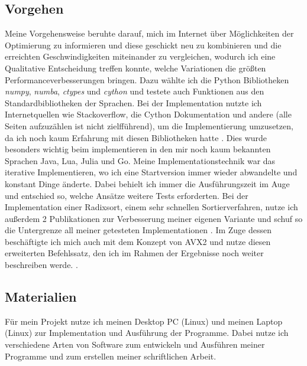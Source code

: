 \documentclass[12pt,a4paper]{article}
\begin{document}
\subsection{Vorgehen}
Meine Vorgehensweise beruhte darauf, mich im Internet über Möglichkeiten der Optimierung zu informieren und diese geschickt neu zu kombinieren und die erreichten Geschwindigkeiten miteinander zu vergleichen, wodurch
ich eine Qualitative Entscheidung treffen konnte, welche Variationen die größten Performanceverbesserungen bringen.
Dazu wählte ich die Python Bibliotheken \textit{numpy}, \textit{numba}, \textit{ctypes} und \textit{cython} und
testete auch Funktionen aus den Standardbibliotheken der Sprachen.
Bei der Implementation nutzte ich Internetquellen wie Stackoverflow, die Cython Dokumentation und andere 
(alle Seiten aufzuzählen ist nicht zielfführend), um die Implementierung umzusetzen, 
da ich noch kaum Erfahrung mit diesen Bibliotheken hatte \cite{stackoverflow} \cite{cythondocs}.
Dies wurde besonders wichtig beim implementieren in den mir noch kaum bekannten Sprachen Java, Lua, Julia und Go.
Meine Implementationstechnik war das iterative Implementieren, wo ich eine Startversion immer wieder abwandelte und
konstant Dinge änderte. Dabei behielt ich immer die Ausführungszeit im Auge und entschied so, welche Ansätze
weitere Tests erforderten.
Bei der Implementation einer Radixsort, einem sehr schnellen Sortierverfahren, nutze ich außerdem 2 Publikationen 
zur Verbesserung meiner eigenen Variante und schuf so die Untergrenze all meiner getesteten Implementationen
\cite{terdiman} \cite{michael}.
Im Zuge dessen beschäftigte ich mich auch mit dem Konzept von AVX2 und nutze diesen erweiterten Befehlssatz, den
ich im Rahmen der Ergebnisse noch weiter beschreiben werde.
\cite{intelavxdocs} \cite{avxguide}.



\clearpage

\subsection{Materialien}
Für mein Projekt nutze ich meinen Desktop PC (Linux) und meinen Laptop (Linux) zur Implementation und Ausführung der Programme.
Dabei nutze ich verschiedene Arten von Software zum entwickeln und Ausführen meiner Programme und zum erstellen meiner
schriftlichen Arbeit. \newline
\end{document}
